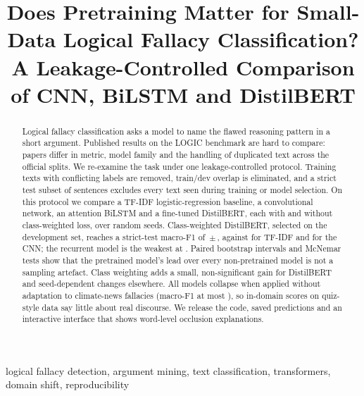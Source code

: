 \documentclass[conference]{IEEEtran}
\begin{document}
\title{Does Pretraining Matter for Small-Data Logical Fallacy Classification? A Leakage-Controlled Comparison of CNN, BiLSTM and DistilBERT}

\author{
}

\maketitle

\begin{abstract}
Logical fallacy classification asks a model to name the flawed reasoning pattern in a short argument. Published results on the LOGIC benchmark are hard to compare: papers differ in metric, model family and the handling of duplicated text across the official splits. We re-examine the task under one leakage-controlled protocol. Training texts with conflicting labels are removed, train/dev overlap is eliminated, and a strict test subset of \nStrict{} sentences excludes every text seen during training or model selection. On this protocol we compare a TF-IDF logistic-regression baseline, a convolutional network, an attention BiLSTM and a fine-tuned DistilBERT, each with and without class-weighted loss, over \nSeeds{} random seeds. Class-weighted DistilBERT, selected on the development set, reaches a strict-test macro-F1 of \fBertCw{}\,$\pm$\,\sdBertCw{}, against \fTfidf{} for TF-IDF and \fCnn{} for the CNN; the recurrent model is the weakest at \fLstm{}. Paired bootstrap intervals and McNemar tests show that the pretrained model's lead over every non-pretrained model is not a sampling artefact. Class weighting adds a small, non-significant gain for DistilBERT and seed-dependent changes elsewhere. All models collapse when applied without adaptation to climate-news fallacies (macro-F1 at most \climBertCw{}), so in-domain scores on quiz-style data say little about real discourse. We release the code, saved predictions and an interactive interface that shows word-level occlusion explanations.
\end{abstract}

\begin{IEEEkeywords}
logical fallacy detection, argument mining, text classification, transformers, domain shift, reproducibility
\end{IEEEkeywords}
\end{document}
